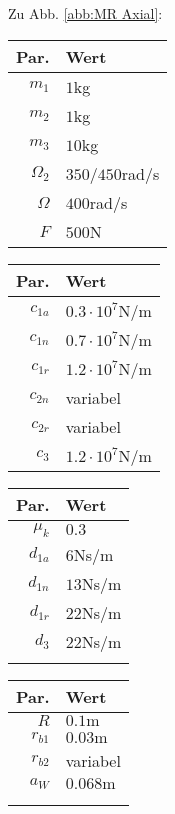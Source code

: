 Zu Abb. \ref{abb:MR Axial}:
\begin{center}
\begin{tabular}{r|l}
Par. &Wert\\\hline
$m_1$&$1$kg\\
$m_2$& $1$kg\\
$m_3$&$10$kg\\
$\Omega_2$&$350$/$450$rad/s\\
$\Omega$&$400$rad/s\\
$F$&$500$N\\
\end{tabular} \hfill
\begin{tabular}{r|l}
Par. &Wert\\\hline
$c_{1a}$&$0.3\cdot10^{7}$N/m\\
$c_{1n}$&$0.7\cdot10^{7}$N/m \\
$c_{1r}$ & $1.2\cdot10^{7}$N/m\\
$c_{2n}$& variabel \\
$c_{2r}$ & variabel \\
$c_{3}$ & $1.2\cdot10^{7}$N/m\\
\end{tabular} \hfill
\begin{tabular}{r|l}
Par. &Wert\\\hline
$\mu_k$& $0.3$\\
$d_{1a}$&$6$Ns/m\\
$d_{1n}$&$13$Ns/m \\
$d_{1r}$ &$22$Ns/m\\
$d_{3}$ & $22$Ns/m\\
&
\end{tabular} \hfill
\begin{tabular}{r|l}
Par. &Wert\\\hline
$R$&$0.1\textrm{m}$ \\
$r_{b1}$&$ 0.03\textrm{m}$\\
$r_{b2}$& variabel\\
$a_{W}$&$ 0.068\textrm{m}$\\
&\\
&
\end{tabular}
\end{center}

